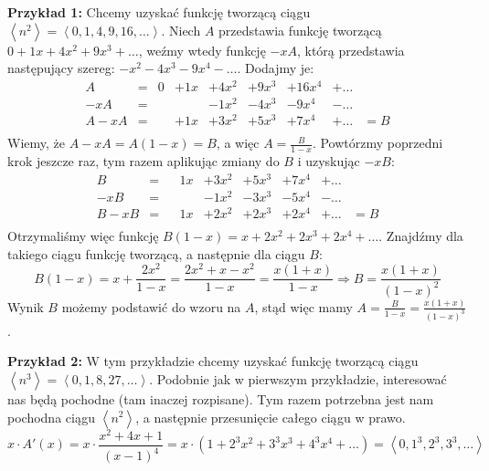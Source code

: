 \documentclass[a4paper,12pt]{article}
\newcommand{\sequence}[1]{\left\langle #1 \right\rangle} %
\begin{document}
\noindent \textbf{Przykład 1:} Chcemy uzyskać funkcję tworzącą ciągu 
$\sequence{n^2} = \sequence{0, 1, 4, 9, 16, \ldots}$. Niech $A$ przedstawia
funkcję tworzącą $0 + 1x + 4x^2 + 9x^3 + \ldots$, weźmy wtedy funkcję $-xA$,
którą przedstawia następujący szereg: $-x^2 - 4x^3 - 9x^4 - \ldots$. Dodajmy je:
\[
\begin{array}{ccccccccc}
    A     &=  &0  &+ 1x &+ 4x^2 &+ 9x^3 &+ 16x^4 &+ \ldots & \\
    -xA   &=  &   &     &- 1x^2 &- 4x^3 &- 9x^4  &- \ldots & \\
    \hline
    A-xA  &=  &   &+ 1x &+ 3x^2 &+ 5x^3 &+ 7x^4  &+ \ldots &= B \\
\end{array}
\]
Wiemy, że $A-xA = A(1-x) = B$, a więc $A = \frac{B}{1-x}$. Powtórzmy poprzedni 
krok jeszcze raz, tym razem aplikując zmiany do $B$ i uzyskując $-xB$:
\[
\begin{array}{ccccccccc}
    B     &=  &   & 1x &+ 3x^2 &+ 5x^3 &+ 7x^4  &+ \ldots & \\
    -xB   &=  &   &    &- 1x^2 &- 3x^3 &- 5x^4  &- \ldots & \\
    \hline
    B-xB  &=  &   & 1x &+ 2x^2 &+ 2x^3 &+ 2x^4  &+ \ldots &= B \\
\end{array}
\]
Otrzymaliśmy więc funkcję $B(1-x) = x + 2x^2 + 2x^3 + 2x^4 + \ldots$. Znajdźmy dla 
takiego ciągu funkcję tworzącą, a następnie dla ciągu $B$:
\[ 
    B(1-x) = x + \frac{2x^2}{1 - x} = \frac{2x^2 + x - x^2}{1 - x} = \frac{x(1+x)}{1-x} 
    \Longrightarrow B = \frac{x(1+x)}{(1-x)^2}
\]
Wynik $B$ możemy podstawić do wzoru na $A$, stąd więc mamy 
$A = \frac{B}{1 - x} = \frac{x(1+x)}{(1-x)^3}$.

\newpage
\noindent \textbf{Przykład 2:} W tym przykładzie chcemy uzyskać funkcję tworzącą
ciągu $\sequence{n^3} = \sequence{0, 1, 8, 27, \ldots}$. Podobnie jak w pierwszym 
przykładzie, interesować nas będą pochodne (tam inaczej rozpisane). Tym razem 
potrzebna jest nam pochodna ciągu $\sequence{n^2}$, a następnie przesunięcie 
całego ciągu w prawo.
\[
    x \cdot A'(x) =  x \cdot \frac{x^2 + 4x + 1}{(x-1)^4} = 
    x \cdot (1 + 2^3x^2 + 3^3x^3 + 4^3x^4 + \ldots) = \sequence{0, 1^3, 2^3, 3^3, \ldots} 
\]
\end{document}
